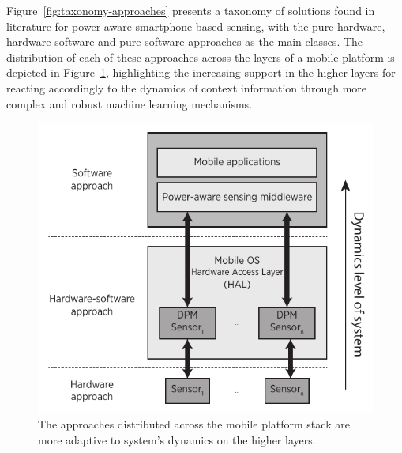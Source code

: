\documentclass[ENG,PhD]{cinvestav}
\begin{document}
Figure~\ref{fig:taxonomy-approaches} presents a taxonomy of solutions found in literature for power-aware smartphone-based sensing, with the pure hardware, hardware-software and pure software approaches as the main classes.
The distribution of each of these approaches across the layers of a mobile platform is depicted in Figure~\ref{fig:distribution-approaches}, highlighting the increasing support in the higher layers for reacting accordingly to the dynamics of context information through more complex and robust machine learning mechanisms.
\begin{figure}[t]
  \centering
  \includegraphics[width=0.5\columnwidth]{approaches-distribution}
  \caption{The approaches distributed across the mobile platform stack are more adaptive to system's dynamics on the higher layers.}
  \label{fig:distribution-approaches}
\end{figure}
\end{document}
